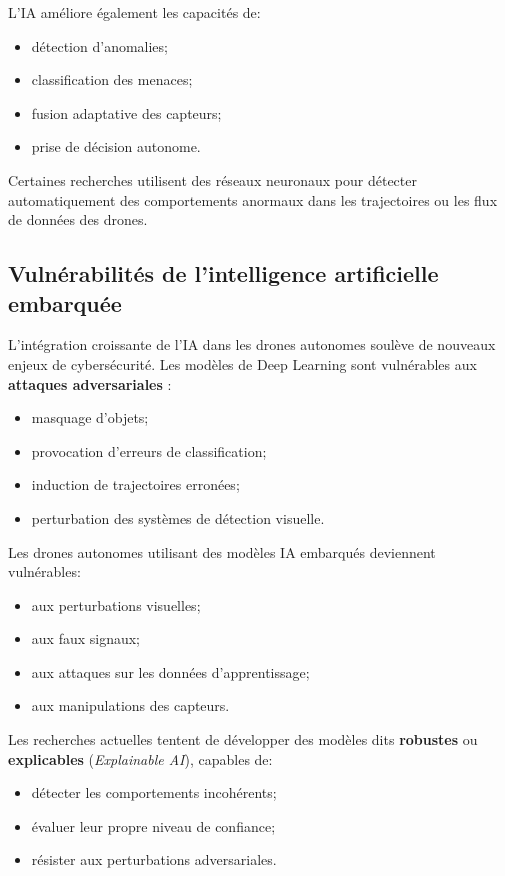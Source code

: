 \documentclass[12pt, a4paper, twoside, openright]{report}
\begin{document}
L’IA améliore également les capacités de:
\begin{itemize}
    \item détection d’anomalies;
    \item classification des menaces;
    \item fusion adaptative des capteurs;
    \item prise de décision autonome.
\end{itemize}

Certaines recherches utilisent des réseaux neuronaux pour détecter automatiquement des comportements anormaux dans les trajectoires ou les flux de données des drones.

\subsection{Vulnérabilités de l’intelligence artificielle embarquée}
L’intégration croissante de l’IA dans les drones autonomes soulève de nouveaux enjeux de cybersécurité. Les modèles de Deep Learning sont vulnérables aux \textbf{attaques adversariales} \cite{arxiv2018adversarial}:
\begin{itemize}
    \item masquage d’objets;
    \item provocation d’erreurs de classification;
    \item induction de trajectoires erronées;
    \item perturbation des systèmes de détection visuelle.
\end{itemize}

Les drones autonomes utilisant des modèles IA embarqués deviennent vulnérables:
\begin{itemize}
    \item aux perturbations visuelles;
    \item aux faux signaux;
    \item aux attaques sur les données d’apprentissage;
    \item aux manipulations des capteurs.
\end{itemize}

Les recherches actuelles tentent de développer des modèles dits \textbf{robustes} ou \textbf{explicables} (\textit{Explainable AI}), capables de:
\begin{itemize}
    \item détecter les comportements incohérents;
    \item évaluer leur propre niveau de confiance;
    \item résister aux perturbations adversariales.
\end{itemize}
\end{document}
